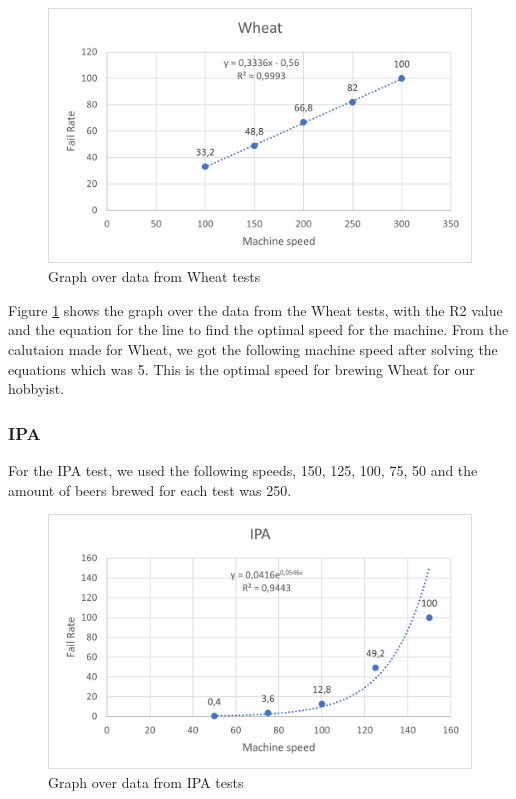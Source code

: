 \begin{center}
    \centering
    \begin{figure}[H]
        \includegraphics[width=1\textwidth]{img/Wheat_graph.png}
        \caption{Graph over data from Wheat tests}
        \label{fig:Wheat_graph}
    \end{figure}
\end{center}

Figure \ref{fig:Wheat_graph} shows the graph over the data from the Wheat tests, with the R2 value and the equation for the line to find the optimal speed for the machine. \newline
From the calutaion made for Wheat, we got the following machine speed after solving the equations which was 5. This is the optimal speed for brewing Wheat for our hobbyist. \newline

\subsubsection{IPA}
For the IPA test, we used the following speeds, 150, 125, 100, 75, 50 and the amount of beers brewed for each test was 250.

\begin{center}
    \centering
    \begin{figure}[H]
        \includegraphics[width=1\textwidth]{img/IPA_graph.png}
        \caption{Graph over data from IPA tests}
        \label{fig:IPA_graph}
    \end{figure}
\end{center}

